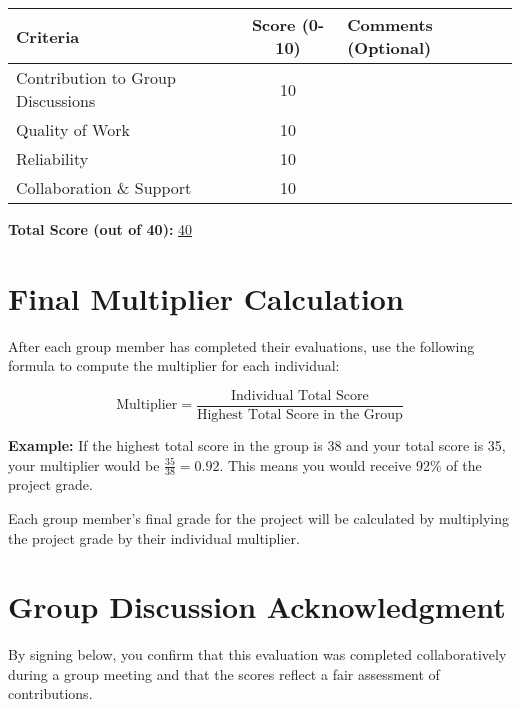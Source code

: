 \documentclass{article}
\begin{document}
\begin{tabular}{|l|c|p{7cm}|}
\hline
\textbf{Criteria} & \textbf{Score (0-10)} & \textbf{Comments (Optional)} \\ \hline
Contribution to Group Discussions & 10 & \\ \hline
Quality of Work & 10 & \\ \hline
Reliability & 10 & \\ \hline
Collaboration \& Support & 10 & \\ \hline
\end{tabular}

\vspace{0.5cm}
\textbf{Total Score (out of 40):} \underline{\hspace{1cm} 40 \hspace{1cm}}

\section*{Final Multiplier Calculation}

After each group member has completed their evaluations, use the following formula to compute the multiplier for each individual:

\[
\text{Multiplier} = \frac{\text{Individual Total Score}}{\text{Highest Total Score in the Group}}
\]

\textbf{Example:} If the highest total score in the group is 38 and your total score is 35, your multiplier would be \(\frac{35}{38} = 0.92\). This means you would receive 92\% of the project grade.

Each group member's final grade for the project will be calculated by multiplying the project grade by their individual multiplier.

\section*{Group Discussion Acknowledgment}

By signing below, you confirm that this evaluation was completed collaboratively during a group meeting and that the scores reflect a fair assessment of contributions.
\end{document}
